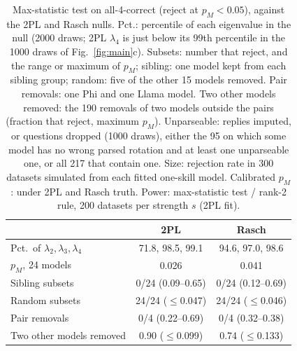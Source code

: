 \documentclass{article}
\theoremstyle{plain}
\theoremstyle{remark}
\begin{document}
\begin{table}[t]
\caption{Max-statistic test on all-4-correct (reject at $p_M<0.05$),
against the 2PL and Rasch nulls. Pct.: percentile of each eigenvalue in
the null (2000 draws; 2PL $\lambda_4$ is just below its 99th percentile
in the 1000 draws of Fig.~\ref{fig:main}c). Subsets: number that reject, and the range or
maximum of $p_M$; sibling: one model kept from each sibling group;
random: five of the other 15 models removed. Pair removals: one Phi and
one Llama model. Two other models removed: the 190 removals of two
models outside the pairs (fraction that reject, maximum $p_M$).
Unparseable: replies imputed, or questions dropped (1000 draws), either
the 95 on which some model has no wrong parsed rotation and at least one
unparseable one, or all 217 that contain one. Size: rejection rate in
300 datasets simulated from each fitted one-skill model. Calibrated
$p_M$: under 2PL and Rasch truth. Power: max-statistic test / rank-2
rule, 200 datasets per strength $s$ (2PL fit).}
\label{tab:fw}
\vskip 0.06in
\centering
\begin{small}
\setlength{\tabcolsep}{4pt}
\begin{tabular}{@{}lcc@{}}
\toprule
& \textbf{2PL} & \textbf{Rasch} \\
\midrule
Pct.\ of $\lambda_2,\lambda_3,\lambda_4$ & 71.8, 98.5, 99.1 & 94.6, 97.0, 98.6 \\
$p_M$, 24 models & 0.026 & 0.041 \\
Sibling subsets & 0/24 (0.09--0.65) & 0/24 (0.12--0.69) \\
Random subsets & 24/24 ($\le$0.047) & 24/24 ($\le$0.046) \\
Pair removals & 0/4 (0.22--0.69) & 0/4 (0.32--0.38) \\
Two other models removed & 0.90 ($\le$0.099) & 0.74 ($\le$0.133) \\

\end{tabular}
\end{small}
\end{table}
\end{document}
